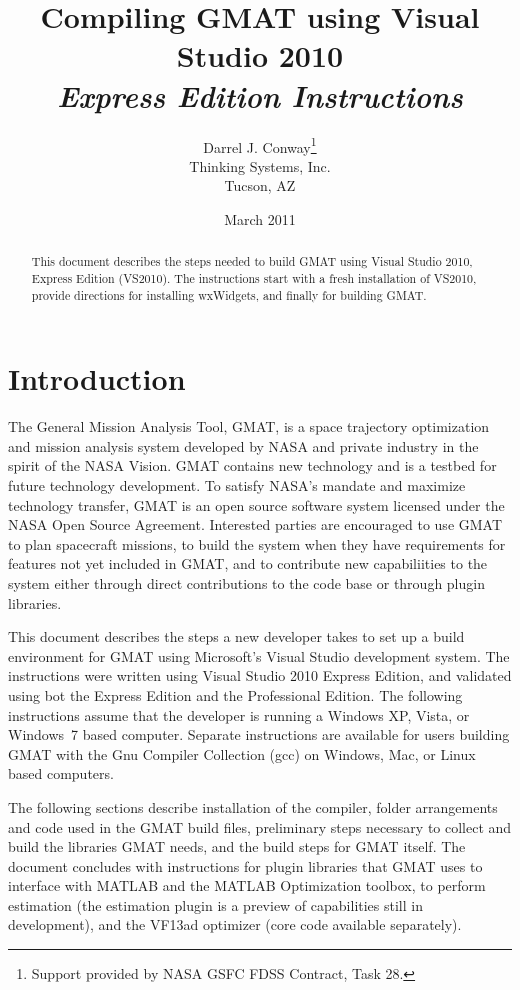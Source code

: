 \documentclass[letterpaper,10pt]{article}%
\begin{document}
\title{Compiling GMAT using Visual Studio 2010\\\textit{Express Edition Instructions}}
\author{Darrel J. Conway\thanks{Support provided by NASA GSFC FDSS Contract, Task 28.}
\\Thinking Systems, Inc.\\Tucson, AZ}
\date{March 2011}
\maketitle

\begin{abstract}
This document describes the steps needed to build GMAT using Visual Studio 2010, Express Edition (VS2010).  The instructions start with a fresh installation of VS2010, provide directions for installing wxWidgets, and finally for building GMAT. 
\end{abstract}

\section{Introduction}

The General Mission Analysis Tool, GMAT, is a space trajectory optimization and mission analysis system developed by NASA and private industry in the spirit of the NASA Vision. GMAT contains new technology and is a testbed for future technology development. To satisfy NASA's mandate and maximize technology transfer, GMAT is an open source software system licensed under the NASA Open Source Agreement.  Interested parties are encouraged to use GMAT to plan spacecraft missions, to build the system when they have requirements for features not yet included in GMAT, and to contribute new capabiliities to the system either through direct contributions to the code base or through plugin libraries.

This document describes the steps a new developer takes to set up a build environment for GMAT using Microsoft's Visual Studio development system.  The instructions were written using Visual Studio 2010 Express Edition, and validated using bot the Express Edition and the Professional Edition.  The following instructions assume that the developer is running a Windows XP, Vista, or Windows~7 based computer.  Separate instructions are available for users building GMAT with the Gnu Compiler Collection (gcc) on Windows, Mac, or Linux based computers.

The following sections describe installation of the compiler, folder arrangements and code used in the GMAT build files, preliminary steps necessary to collect and build the libraries GMAT needs, and the build steps for GMAT itself.  The document concludes with instructions for plugin libraries that GMAT uses to interface with MATLAB and the MATLAB Optimization toolbox, to perform estimation (the estimation plugin is a preview of capabilities still in development), and the VF13ad optimizer (core code available separately).
\end{document}
